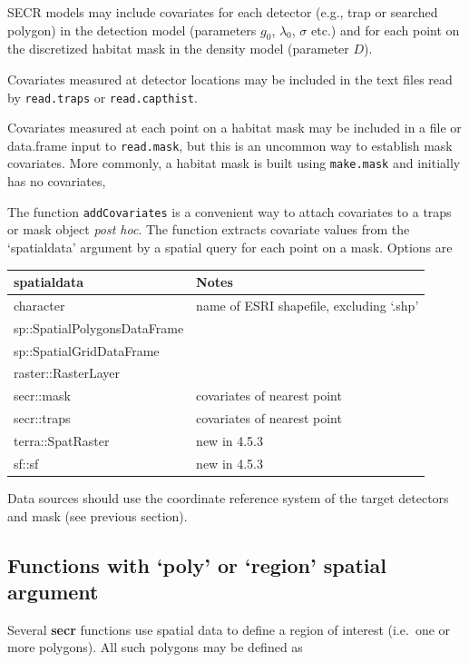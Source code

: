 \documentclass[
]{book}
\begin{document}
SECR models may include covariates for each detector (e.g., trap or searched polygon) in the detection model (parameters \(g_0\), \(\lambda_0\), \(\sigma\) etc.) and for each point on the discretized habitat mask in the density model (parameter \(D\)).

Covariates measured at detector locations may be included in the text files read by \texttt{read.traps} or \texttt{read.capthist}.

Covariates measured at each point on a habitat mask may be included in a file or data.frame input to \texttt{read.mask}, but this is an uncommon way to establish mask covariates. More commonly, a habitat mask is built using \texttt{make.mask} and initially has no covariates,

The function \texttt{addCovariates} is a convenient way to attach covariates to a traps or mask object \emph{post hoc}. The function extracts covariate values from the `spatialdata' argument by a spatial query for each point on a mask. Options are

\begin{longtable}[]{@{}ll@{}}
\toprule\noalign{}
spatialdata & Notes \\
\midrule\noalign{}
\endhead
\bottomrule\noalign{}
\endlastfoot
character & name of ESRI shapefile, excluding `.shp' \\
sp::SpatialPolygonsDataFrame & \\
sp::SpatialGridDataFrame & \\
raster::RasterLayer & \\
secr::mask & covariates of nearest point \\
secr::traps & covariates of nearest point \\
terra::SpatRaster & new in 4.5.3 \\
sf::sf & new in 4.5.3 \\
\end{longtable}

Data sources should use the coordinate reference system of the target detectors and mask (see previous section).

\subsection{Functions with `poly' or `region' spatial argument}\label{functions-with-poly-or-region-spatial-argument}

Several \textbf{secr} functions use spatial data to define a region of interest (i.e.~one or more polygons). All such polygons may be defined as
\end{document}
